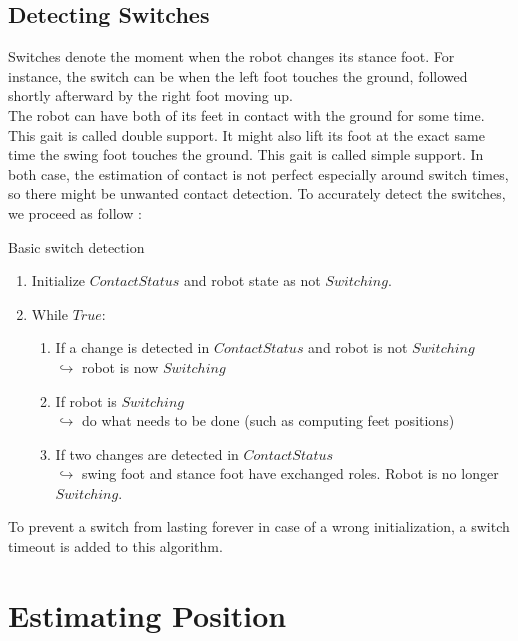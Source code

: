 \documentclass[a4paper,10pt]{article}
\begin{document}
\subsection{Detecting Switches}
Switches denote the moment when the robot changes its stance foot. For instance, the switch can be when the left foot touches the ground, followed shortly afterward by the right foot moving up.\\
The robot can have both of its feet in contact with the ground for some time. This gait is called double support. It might also lift its foot at the exact same time the swing foot touches the ground. This gait is called simple support. In both case, the estimation of contact is not perfect especially around switch times, so there might be unwanted contact detection. To accurately detect the switches, we proceed as follow : 
\begin{algorithm}[htb]
  \caption{Basic switch detection}
  \begin{enumerate}
    \item
    Initialize $Contact Status$ and robot state as not $Switching$.

    \item
    While $True$:
    \begin{enumerate}
      \item
      If a change is detected in $Contact Status$ and robot is not $Switching$\\
      $\hookrightarrow$ robot is now $Switching$

      \item
      If robot is $Switching$\\
      $\hookrightarrow$ do what needs to be done (such as computing feet positions)

      \item
      If two changes are detected in $Contact Status$ \\
      $\hookrightarrow$ swing foot and stance foot have exchanged roles. Robot is no longer $Switching$.
    \end{enumerate}
  \end{enumerate}
\end{algorithm}
To prevent a switch from lasting forever in case of a wrong initialization, a switch timeout is added to this algorithm.

\section{Estimating Position}
\end{document}
